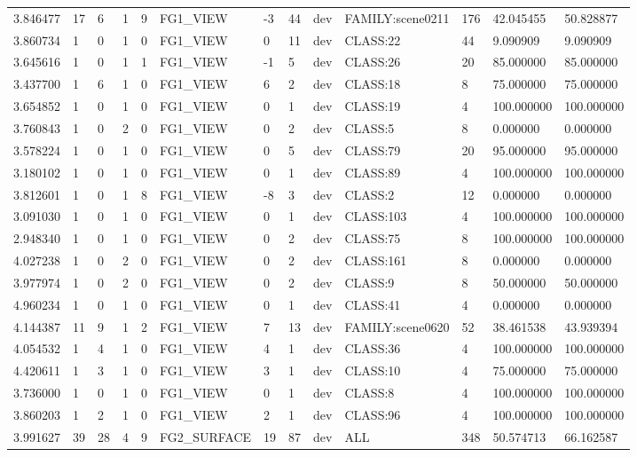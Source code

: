 \begin{tabular}{lllllllllllll}
3.846477 & 17 & 6 & 1 & 9 & FG1\_VIEW & -3 & 44 & dev & FAMILY:scene0211 & 176 & 42.045455 & 50.828877 \\
3.860734 & 1 & 0 & 1 & 0 & FG1\_VIEW & 0 & 11 & dev & CLASS:22 & 44 & 9.090909 & 9.090909 \\
3.645616 & 1 & 0 & 1 & 1 & FG1\_VIEW & -1 & 5 & dev & CLASS:26 & 20 & 85.000000 & 85.000000 \\
3.437700 & 1 & 6 & 1 & 0 & FG1\_VIEW & 6 & 2 & dev & CLASS:18 & 8 & 75.000000 & 75.000000 \\
3.654852 & 1 & 0 & 1 & 0 & FG1\_VIEW & 0 & 1 & dev & CLASS:19 & 4 & 100.000000 & 100.000000 \\
3.760843 & 1 & 0 & 2 & 0 & FG1\_VIEW & 0 & 2 & dev & CLASS:5 & 8 & 0.000000 & 0.000000 \\
3.578224 & 1 & 0 & 1 & 0 & FG1\_VIEW & 0 & 5 & dev & CLASS:79 & 20 & 95.000000 & 95.000000 \\
3.180102 & 1 & 0 & 1 & 0 & FG1\_VIEW & 0 & 1 & dev & CLASS:89 & 4 & 100.000000 & 100.000000 \\
3.812601 & 1 & 0 & 1 & 8 & FG1\_VIEW & -8 & 3 & dev & CLASS:2 & 12 & 0.000000 & 0.000000 \\
3.091030 & 1 & 0 & 1 & 0 & FG1\_VIEW & 0 & 1 & dev & CLASS:103 & 4 & 100.000000 & 100.000000 \\
2.948340 & 1 & 0 & 1 & 0 & FG1\_VIEW & 0 & 2 & dev & CLASS:75 & 8 & 100.000000 & 100.000000 \\
4.027238 & 1 & 0 & 2 & 0 & FG1\_VIEW & 0 & 2 & dev & CLASS:161 & 8 & 0.000000 & 0.000000 \\
3.977974 & 1 & 0 & 2 & 0 & FG1\_VIEW & 0 & 2 & dev & CLASS:9 & 8 & 50.000000 & 50.000000 \\
4.960234 & 1 & 0 & 1 & 0 & FG1\_VIEW & 0 & 1 & dev & CLASS:41 & 4 & 0.000000 & 0.000000 \\
4.144387 & 11 & 9 & 1 & 2 & FG1\_VIEW & 7 & 13 & dev & FAMILY:scene0620 & 52 & 38.461538 & 43.939394 \\
4.054532 & 1 & 4 & 1 & 0 & FG1\_VIEW & 4 & 1 & dev & CLASS:36 & 4 & 100.000000 & 100.000000 \\
4.420611 & 1 & 3 & 1 & 0 & FG1\_VIEW & 3 & 1 & dev & CLASS:10 & 4 & 75.000000 & 75.000000 \\
3.736000 & 1 & 0 & 1 & 0 & FG1\_VIEW & 0 & 1 & dev & CLASS:8 & 4 & 100.000000 & 100.000000 \\
3.860203 & 1 & 2 & 1 & 0 & FG1\_VIEW & 2 & 1 & dev & CLASS:96 & 4 & 100.000000 & 100.000000 \\
3.991627 & 39 & 28 & 4 & 9 & FG2\_SURFACE & 19 & 87 & dev & ALL & 348 & 50.574713 & 66.162587 \\

\end{tabular}
